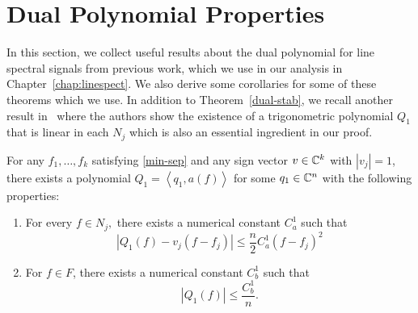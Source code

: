 \chapter{Dual Polynomial Properties}
\label{apx:collection}

In this section, we collect useful results about the dual polynomial for line
spectral signals from previous work, which we use in our analysis in
Chapter~\ref{chap:linespect}. We also derive some corollaries for some of these
theorems which we use. In addition to Theorem~\ref{dual-stab}, we recall another
result in~\cite{cg_noisy} where the authors show the existence of a
trigonometric polynomial $Q_1$ that is linear in each $N_j$ which is also an
essential ingredient in our proof.

\begin{theorem}
\label{dual-lin}
For any $f_1, \ldots, f_k$ satisfying \eqref{min-sep} and any sign vector $v \in
\mathbb{C}^k$ with $|v_j|=1$, there exists a polynomial $Q_1 = \left<q_1, a(f)\right>$
for some $q_1 \in \mathbb{C}^n$ with the following properties:
\begin{enumerate}
\item For every $f \in N_j,$ there exists a numerical constant $C_a^1$ such that
\begin{equation}
\label{ca1}
|Q_1(f) - v_j(f-f_j)| \leq \frac{n}{2} C_a^1 (f-f_j)^2
\end{equation}
\item For $f \in F$, there exists a numerical constant $C_b^1$ such that
\begin{equation}
\label{cb1}
|Q_1(f)| \leq \frac{C_b^1}{n}.
\end{equation}
\end{enumerate}
\end{theorem}

